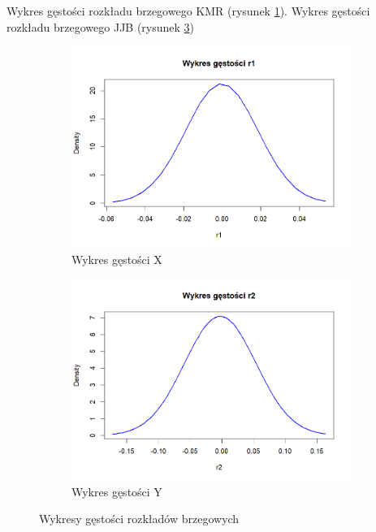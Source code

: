 \documentclass[a4paper,11pt]{article}
\begin{document}
Wykres gęstości rozkładu brzegowego KMR (rysunek \ref{fig:wykres_gestosc_r1}).
Wykres gęstości rozkładu brzegowego JJB (rysunek \ref{fig:wykres_gestosc_r2})
\begin{figure}[!htb]
    \begin{subfigure}{0.45\textwidth}
        \centering
        \includegraphics[width=\linewidth]{images/wykres_gestosc_r1.png}
        \caption{Wykres gęstości X}
        \label{fig:wykres_gestosc_r1}
    \end{subfigure}\hfill
    \begin{subfigure}{0.45\textwidth}
        \centering
        \includegraphics[width=\linewidth]{images/wykres_gestosc_r2.png}
        \caption{Wykres gęstości Y}
        \label{fig:wykres_gestosc_r2}
    \end{subfigure}
    
    \caption{Wykresy gęstości rozkładów brzegowych}
\end{figure}
\end{document}

